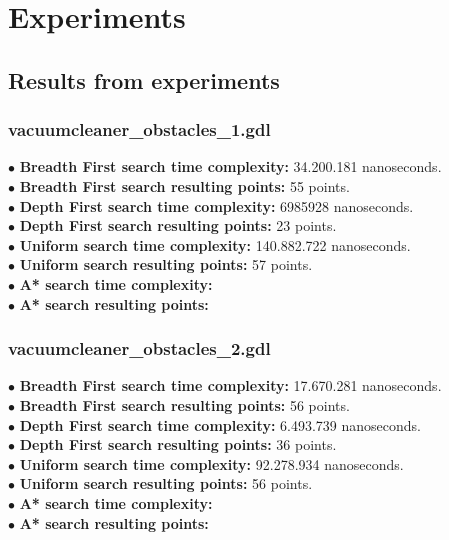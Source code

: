\documentclass[11pt]{article}
\begin{document}
\section{Experiments}
\subsection{Results from experiments}
\subsubsection{vacuumcleaner\_obstacles\_1.gdl}
$\bullet$ {\bf Breadth First search time complexity: } 34.200.181 nanoseconds. \\
$\bullet$ {\bf Breadth First search resulting points: } 55 points. \\
$\bullet$ {\bf Depth First search time complexity: } 6985928 nanoseconds. \\
$\bullet$ {\bf Depth First search resulting points: } 23 points. \\
$\bullet$ {\bf Uniform search time complexity: } 140.882.722 nanoseconds.\\
$\bullet$ {\bf Uniform search resulting points: } 57 points.\\
$\bullet$ {\bf A* search time complexity: } \\ 
$\bullet$ {\bf A* search resulting points: }\\
\subsubsection{vacuumcleaner\_obstacles\_2.gdl}
$\bullet$ {\bf Breadth First search time complexity: } 17.670.281 nanoseconds. \\
$\bullet$ {\bf Breadth First search resulting points: } 56 points. \\
$\bullet$ {\bf Depth First search time complexity: } 6.493.739 nanoseconds. \\
$\bullet$ {\bf Depth First search resulting points: } 36 points. \\
$\bullet$ {\bf Uniform search time complexity: } 92.278.934 nanoseconds. \\
$\bullet$ {\bf Uniform search resulting points: } 56 points.\\
$\bullet$ {\bf A* search time complexity: } \\ 
$\bullet$ {\bf A* search resulting points: }\\
\end{document}
